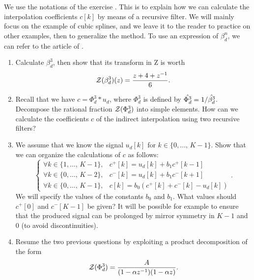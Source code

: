  
\begin{exo}
\label{exo-calcul-spline-iir}
 
  We use the notations of the exercise . This is to explain how we can calculate the interpolation coefficients $ c [k] $ by means of a recursive filter. We will mainly focus on the example of cubic splines, and we leave it to the reader to practice on other examples, then to generalize the method. To use an expression of $ \beta^n_d $, we can refer to the article of . \begin{enumerate}
\item Calculate $ \beta^3_d $, then show that its transform in Z is worth
\begin{equation*}
\mathcal{Z} (\beta^3_d) (z) = \frac{z + 4 + z^{-1}}{6}.
\end{equation*}
 
\item {}  Recall that we have $ c = \Phi^3_d * u_d $, where $ \Phi^3_d $ is defined by $ \hat{\Phi^3_d} = 1 / \hat{\beta^3_d} $. Decompose the rational fraction $ \mathcal{Z} (\Phi^3_d) $ into simple elements. How can we calculate the coefficients $ c $ of the indirect interpolation using two recursive filters?
\item We assume that we know the signal $ u_d [k] $ for $ k \in \{0, \ldots, \, K-1 \} $. Show that we can organize the calculations of $ c $ as follows:
\begin{equation*}
\left\{\begin{array}{ll} \forall k \in \{1, \ldots, \, K-1 \}, & c^+ [k] = u_d [k] + b_1 c^+ [ k-1] \\\forall k \in \{0, \ldots, \, K-2 \}, & c^- [k] = u_d [k] + b_1 c^- [k + 1] \\\forall k \in \{0, \ldots, \, K-1 \}, & c [k] = b_0 (c^+ [k] + c^- [k] - u_d [k]) \end{array} \right. .
\end{equation*}
We will specify the values of the constants $ b_0 $ and $ b_1 $. What values should $ c^+ [0] $ and $ c^- [K-1] $ be given? It will be possible for example to ensure that the produced signal can be prolonged by mirror symmetry in $ K-1 $ and $ 0 $ (to avoid discontinuities).
\item Resume the two previous questions by exploiting a product decomposition of the form
\begin{equation*}
\mathcal{Z} (\Phi^3_d) = \frac{A}{(1- \alpha z^{-1}) (1- \alpha z)}.
\end{equation*}
\end{enumerate}
\end{exo}
 

